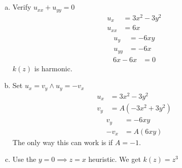 \documentclass[12pt]{article}
\begin{document}
\section{}
\begin{enumerate}[(a)]
	\item Verify $ u_{xx} + u_{yy} = 0 $
	\begin{align*}
		u_x &= 3x^2-3y^2\\
		u_{xx} &= 6x
	\end{align*}
	\begin{align*}
		u_{y} &= -6xy\\
		u_{yy} &= -6x
	\end{align*}
	\begin{align*}
		6x - 6x &= 0
	\end{align*}
	$ k(z) $ is harmonic.
	
	\item Set $ u_x = v_y \land u_y = -v_x $
	\begin{align*}
		u_x &= 3x^2 -3y^2\\
		v_y &= A(-3x^2 + 3y^2)
	\end{align*}
	\begin{align*}
		v_y &= -6xy\\
		-v_x &= A(6xy)
	\end{align*}
	The only way this can work is if $ A = -1 $.
	
	\item Use the $ y=0 \implies z = x $ heuristic. We get $ k(z) = z^3 $
\end{enumerate}
\newpage
\end{document}
